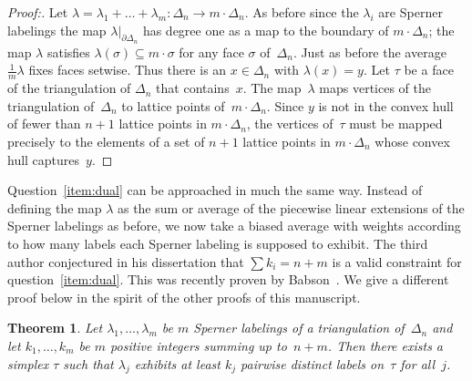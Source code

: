 \documentclass[a4paper,10pt,reqno, english]{amsart}
\theoremstyle{plain}
\newtheorem{thm}{Theorem}
\theoremstyle{definition}
\begin{document}
\begin{proof}[Proof:]
	Let $\lambda = \lambda_1+ \dots + \lambda_m \colon \Delta_n \longrightarrow m\cdot \Delta_n$. As before since the $\lambda_i$ are
	Sperner labelings the map $\lambda|_{\partial\Delta_n}$ has degree one as a map to the boundary of $m\cdot \Delta_n$; the map
	$\lambda$ satisfies $\lambda(\sigma) \subseteq m \cdot \sigma$ for any face $\sigma$ of~$\Delta_n$. Just as before the average 
	$\frac1m \lambda$ fixes faces setwise. Thus there
	is an $x \in \Delta_n$ with $\lambda(x) = y$. Let $\tau$ be a face of the triangulation of $\Delta_n$ that contains~$x$. The map~$\lambda$
	maps vertices of the triangulation of~$\Delta_n$ to lattice points of~$m \cdot \Delta_n$. Since $y$ is not in the convex hull of fewer than
	$n+1$ lattice points in $m \cdot \Delta_n$, the vertices of~$\tau$ must be mapped precisely to the elements of a set of $n+1$ lattice points
	in $m\cdot \Delta_n$ whose convex hull captures~$y$.
\end{proof}

Question~\ref{item:dual} can be approached in much the same way. Instead of defining the map $\lambda$ as the sum or average of the 
piecewise linear extensions of the Sperner labelings as before, we now take a biased average with weights according to how many labels
each Sperner labeling is supposed to exhibit. The third author conjectured in his dissertation that $\sum k_i = n+m$ is a valid constraint for
question~\ref{item:dual}. This was recently proven by Babson~\cite{babson2012}. We give a different proof below in the spirit of 
the other proofs of this manuscript.

\begin{thm}
Let $\lambda_1,\ldots,\lambda_m$ be $m$ Sperner labelings of a triangulation of~$\Delta_n$ and let $k_1,\ldots,k_m$ be $m$ positive integers 
summing up to~$n+m$. Then there exists a simplex $\tau$ such that $\lambda_j$ exhibits at least $k_j$ pairwise distinct labels on~$\tau$ for all~$j$.
\end{thm}
\end{document}
